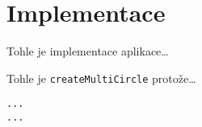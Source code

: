\hypertarget{implementace}{%
\chapter{Implementace}\label{implementace}}

Tohle je implementace aplikace\ldots{}

Tohle je \verb|createMultiCircle| protože\ldots{}

\begin{verbatim}
...
...
\end{verbatim}
